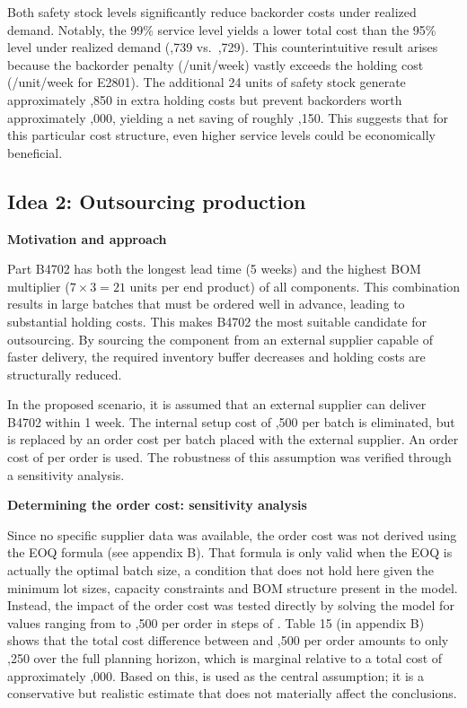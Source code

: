 \documentclass[a4paper,faculty=eb,language=en,doctype=article,sftitles=false]{ugent-doc}
\begin{document}
Both safety stock levels significantly reduce backorder costs under realized demand. Notably, the 99\% service level yields a lower total cost than the 95\% level under realized demand (,739 vs.\ ,729). This counterintuitive result arises because the backorder penalty (/unit/week) vastly exceeds the holding cost (/unit/week for E2801). The additional 24 units of safety stock generate approximately ,850 in extra holding costs but prevent backorders worth approximately ,000, yielding a net saving of roughly ,150. This suggests that for this particular cost structure, even higher service levels could be economically beneficial.

\subsection*{Idea 2: Outsourcing production}

\textbf{Motivation and approach}

Part B4702 has both the longest lead time (5 weeks) and the highest BOM multiplier ($7 \times 3 = 21$ units per end product) of all components. This combination results in large batches that must be ordered well in advance, leading to substantial holding costs. This makes B4702 the most suitable candidate for outsourcing. By sourcing the component from an external supplier capable of faster delivery, the required inventory buffer decreases and holding costs are structurally reduced.

In the proposed scenario, it is assumed that an external supplier can deliver B4702 within 1 week. The internal setup cost of ,500 per batch is eliminated, but is replaced by an order cost per batch placed with the external supplier. An order cost of  per order is used. The robustness of this assumption was verified through a sensitivity analysis.

\vspace{0.5em}
\textbf{Determining the order cost: sensitivity analysis}

{
Since no specific supplier data was available, the order cost was not derived using the EOQ formula (see appendix B). That formula is only valid when the EOQ is actually the optimal batch size, a condition that does not hold here given the minimum lot sizes, capacity constraints and BOM structure present in the model. Instead, the impact of the order cost was tested directly by solving the model for values ranging from  to ,500 per order in steps of .
Table 15 (in appendix B) shows that the total cost difference between  and ,500 per order amounts to only ,250 over the full planning horizon, which is marginal relative to a total cost of approximately ,000. Based on this,  is used as the central assumption; it is a conservative but realistic estimate that does not materially affect the conclusions.
\par}
\end{document}
